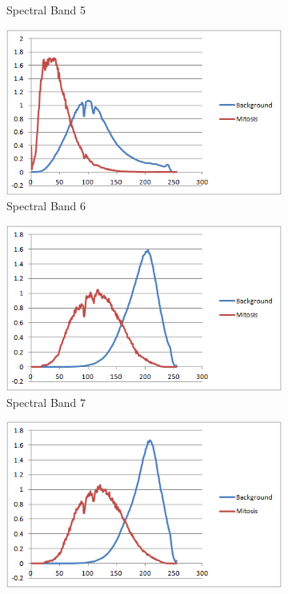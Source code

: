 \documentclass[10pt,twocolumn,letterpaper]{article}
\begin{document}
\begin{figure}[b]
\begin{subfigure}[b]{0.22\textwidth}
		\caption*{Spectral Band 5}
	\end{subfigure}
	\begin{subfigure}[b]{0.22\textwidth}
		\includegraphics[width=\textwidth]{diagrams/Band6.png}
		\caption*{Spectral Band 6}
	\end{subfigure}
	\begin{subfigure}[b]{0.22\textwidth}
		\includegraphics[width=\textwidth]{diagrams/Band7.png}
		\caption*{Spectral Band 7}
	\end{subfigure}
	\begin{subfigure}[b]{0.22\textwidth}
		\includegraphics[width=\textwidth]{diagrams/Band8.png}

\end{subfigure}
\end{figure}
\end{document}
